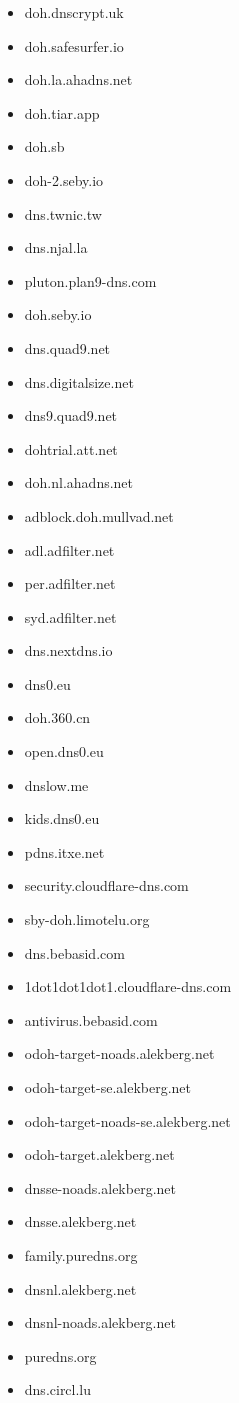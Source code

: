\begin{itemize}
\item doh.dnscrypt.uk
\item doh.safesurfer.io
\item doh.la.ahadns.net
\item doh.tiar.app
\item doh.sb
\item doh-2.seby.io
\item dns.twnic.tw
\item dns.njal.la
\item pluton.plan9-dns.com
\item doh.seby.io
\item dns.quad9.net
\item dns.digitalsize.net
\item dns9.quad9.net
\item dohtrial.att.net
\item doh.nl.ahadns.net
\item adblock.doh.mullvad.net
\item adl.adfilter.net
\item per.adfilter.net
\item syd.adfilter.net
\item dns.nextdns.io
\item dns0.eu
\item doh.360.cn
\item open.dns0.eu
\item dnslow.me
\item kids.dns0.eu
\item pdns.itxe.net
\item security.cloudflare-dns.com
\item sby-doh.limotelu.org
\item dns.bebasid.com
\item 1dot1dot1dot1.cloudflare-dns.com
\item antivirus.bebasid.com
\item odoh-target-noads.alekberg.net
\item odoh-target-se.alekberg.net
\item odoh-target-noads-se.alekberg.net
\item odoh-target.alekberg.net
\item dnsse-noads.alekberg.net
\item dnsse.alekberg.net
\item family.puredns.org
\item dnsnl.alekberg.net
\item dnsnl-noads.alekberg.net
\item puredns.org
\item dns.circl.lu
\end{itemize}
